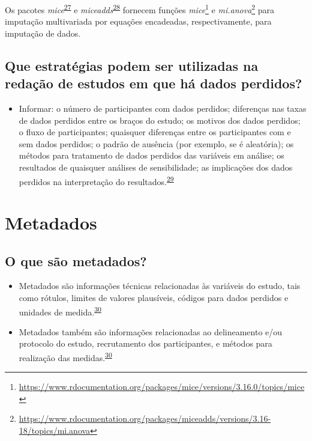 \documentclass[
]{book}
\providecommand{\tightlist}{%
  \setlength{\itemsep}{0pt}\setlength{\parskip}{0pt}}
\renewcommand{\href}[2]{#2\footnote{\url{#1}}}
\newenvironment{infobox}[1]
  {
  \begin{itemize}
  \renewcommand{\labelitemi}{
    \raisebox{-.7\height}[0pt][0pt]{
      {\setkeys{Gin}{width=3em,keepaspectratio}
        \texttt{[image: \#1]}}
    }
  }
  \setlength{\fboxsep}{1em}
  \begin{blackbox}
  \item
  }
  {
  \end{blackbox}
  \end{itemize}
  }
\begin{document}
\begin{infobox}{images/Rlogo}
Os pacotes \emph{mice}\textsuperscript{\protect\hyperlink{ref-mice}{27}} e \emph{miceadds}\textsuperscript{\protect\hyperlink{ref-miceadds}{28}} fornecem funções \href{https://www.rdocumentation.org/packages/mice/versions/3.16.0/topics/mice}{\emph{mice}} e \href{https://www.rdocumentation.org/packages/miceadds/versions/3.16-18/topics/mi.anova}{\emph{mi.anova}} para imputação multivariada por equações encadeadas, respectivamente, para imputação de dados.

\end{infobox}

\hypertarget{que-estratuxe9gias-podem-ser-utilizadas-na-redauxe7uxe3o-de-estudos-em-que-huxe1-dados-perdidos}{%
\subsection{Que estratégias podem ser utilizadas na redação de estudos em que há dados perdidos?}\label{que-estratuxe9gias-podem-ser-utilizadas-na-redauxe7uxe3o-de-estudos-em-que-huxe1-dados-perdidos}}

\begin{itemize}
\tightlist
\item
  Informar: o número de participantes com dados perdidos; diferenças nas taxas de dados perdidos entre os braços do estudo; os motivos dos dados perdidos; o fluxo de participantes; quaisquer diferenças entre os participantes com e sem dados perdidos; o padrão de ausência (por exemplo, se é aleatória); os métodos para tratamento de dados perdidos das variáveis em análise; os resultados de quaisquer análises de sensibilidade; as implicações dos dados perdidos na interpretação do resultados.\textsuperscript{\protect\hyperlink{ref-Akl2015}{29}}
\end{itemize}

\hypertarget{metadados}{%
\section{Metadados}\label{metadados}}

\hypertarget{o-que-suxe3o-metadados}{%
\subsection{O que são metadados?}\label{o-que-suxe3o-metadados}}

\begin{itemize}
\item
  Metadados são informações técnicas relacionadas às variáveis do estudo, tais como rótulos, limites de valores plausíveis, códigos para dados perdidos e unidades de medida.\textsuperscript{\protect\hyperlink{ref-Baillie2022}{30}}
\item
  Metadados também são informações relacionadas ao delineamento e/ou protocolo do estudo, recrutamento dos participantes, e métodos para realização das medidas.\textsuperscript{\protect\hyperlink{ref-Baillie2022}{30}}
\end{itemize}
\end{document}
